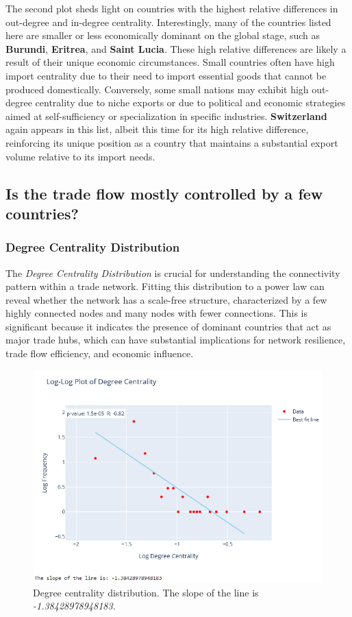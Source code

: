 \documentclass[12pt, a4paper]{article}
\begin{document}
The second plot sheds light on countries with the highest relative differences in out-degree and in-degree centrality. Interestingly, many of the countries listed here are smaller or less economically dominant on the global stage, such as \textbf{Burundi}, \textbf{Eritrea}, and \textbf{Saint Lucia}. These high relative differences are likely a result of their unique economic circumstances. Small countries often have high import centrality due to their need to import essential goods that cannot be produced domestically. Conversely, some small nations may exhibit high out-degree centrality due to niche exports or due to political and economic strategies aimed at self-sufficiency or specialization in specific industries. \textbf{Switzerland} again appears in this list, albeit this time for its high relative difference, reinforcing its unique position as a country that maintains a substantial export volume relative to its import needs.

\subsection{Is the trade flow mostly controlled by a few countries?}
\subsubsection{Degree Centrality Distribution}

The \textit{Degree Centrality Distribution} is crucial for understanding the connectivity pattern within a trade network. Fitting this distribution to a power law can reveal whether the network has a scale-free structure, characterized by a few highly connected nodes and many nodes with fewer connections. This is significant because it indicates the presence of dominant countries that act as major trade hubs, which can have substantial implications for network resilience, trade flow efficiency, and economic influence.

\begin{figure}[ht]
\centering
\includegraphics[width=.5\textwidth]{figures/question2/figure_4.png}
\captionsetup{font=scriptsize,labelfont=bf}
\caption{Degree centrality distribution. The slope of the line is \textit{-1.38428978948183}.}
\label{fig:figure4}
\end{figure}
\end{document}
